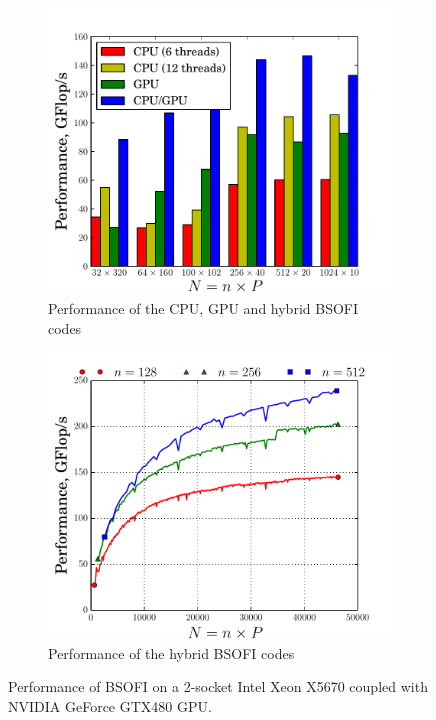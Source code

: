 \documentclass{llncs}
\begin{document}
\begin{figure}[t]
  \begin{subfigure}[t]{0.49\linewidth}
    \includegraphics[width=\textwidth]{./figs/pdf/BSOFI_BSOI_12}
    \caption{Performance of the CPU, GPU and hybrid BSOFI codes\label{fig:compare_BSOFTRI+BSOI}}
  \end{subfigure}
  \begin{subfigure}[t]{0.49\linewidth}
    \includegraphics[width=\textwidth]{./figs/pdf/BSOFTRI_BSOI}
    \caption{Performance of the hybrid BSOFI codes\label{fig:perf_hybrid_BSOFTRI_BSOI}}
  \end{subfigure}
  \caption{Performance of BSOFI on 
    a 2-socket Intel Xeon X5670 coupled with NVIDIA GeForce GTX480 GPU.} 
  \label{fig:performance_BSO}
\end{figure}
\end{document}
